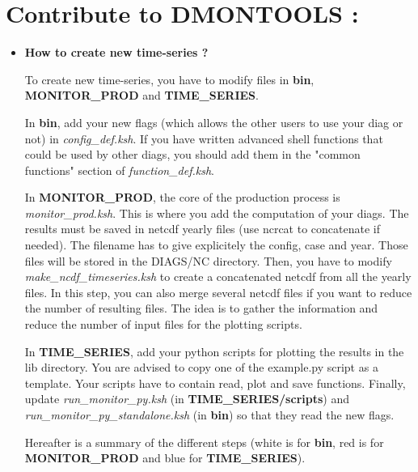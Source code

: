 \documentclass[a4paper,11pt]{article}
\begin{document}
\clearpage
\newpage

\section{Contribute to DMONTOOLS :}

\begin{itemize}

\item \textbf{How to create new time-series ?}

To create new time-series, you have to modify files in \textbf{bin}, \textbf{MONITOR\_PROD} and \textbf{TIME\_SERIES}.

In \textbf{bin}, add your new flags (which allows the other users to use your diag or not) in \textit{config\_def.ksh}. 
If you have written advanced shell functions that could be used by other diags, you should add them in the "common functions" 
section of \textit{function\_def.ksh}.

In \textbf{MONITOR\_PROD}, the core of the production process is \textit{monitor\_prod.ksh}. This is where you add
the computation of your diags.
The results must be saved in netcdf yearly files (use ncrcat to concatenate if needed). The filename has
to give explicitely the config, case and year. Those files will be stored in the DIAGS/NC directory.
Then, you have to modify \textit{make\_ncdf\_timeseries.ksh} to create a concatenated netcdf from all the yearly files.
In this step, you can also merge several netcdf files if you want to reduce the number of resulting files.
The idea is to gather the information and reduce the number of input files for the plotting scripts.

In \textbf{TIME\_SERIES}, add your python scripts for plotting the results in the lib directory. You are advised
to copy one of the example.py script as a template. Your scripts have to contain read, plot and save functions.
Finally, update \textit{run\_moni\-tor\_py.ksh} (in \textbf{TIME\_SERIES/scripts}) and 
\textit{run\_moni\-tor\_py\_stand\-alone.ksh} (in \textbf{bin}) so that they read the new flags.

Hereafter is a summary of the different steps (white is for \textbf{bin}, red is for \textbf{MONITOR\_PROD} and blue for
\textbf{TIME\_SERIES}).

\begin{center}
\begin{tikzpicture}
[node distance=.8cm,
  start chain=going below,]


\end{tikzpicture}
\end{center}
\end{itemize}
\end{document}
